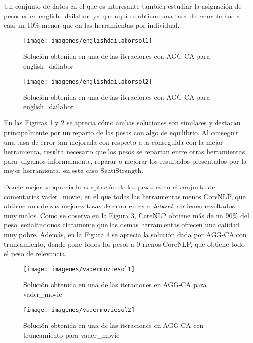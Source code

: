 Un conjunto de datos en el que es interesante también estudiar la asignación de pesos es en english\_dailabor, ya que aquí se obtiene una tasa de error de hasta casi un 10\% menor que en las herramientas por individual. 

\newpage
\begin{figure} [H]
	\centering
	\texttt{[image: imagenes/englishdailaborsol1]}
	\caption{Solución obtenida en una de las iteraciones con AGG-CA para english\_dailabor}
	\label{fig:englishdailaborsol1}
\end{figure}

\begin{figure} [H]
	\centering
	\texttt{[image: imagenes/englishdailaborsol2]}
	\caption{Solución obtenida en una de las iteraciones con AGG-CA para english\_dailabor}
	\label{fig:englishdailaborsol2}
\end{figure}

En las Figuras \ref{fig:englishdailaborsol1} y \ref{fig:englishdailaborsol2} se aprecia cómo ambas soluciones son similares y destacan principalmente por un reparto de los pesos con algo de equilibrio. Al conseguir una tasa de error tan mejorada con respecto a la conseguida con la mejor herramienta, resulta necesario que los pesos se repartan entre otras herramientas para, digamos informalmente, reparar o mejorar los resultados presentados por la mejor herramienta, en este caso SentiStrength.

Donde mejor se aprecia la adaptación de los pesos es en el conjunto de comentarios vader\_movie, en el que todas las herramientas menos CoreNLP, que obtiene una de sus mejores tasas de error en este \textit{dataset}, obtienen resultados muy malos. Como se observa en la Figura \ref{fig:vadermoviesol1}, CoreNLP obtiene más de un 90\% del peso, señalándonos claramente que las demás herramientas ofrecen una calidad muy pobre. Además, en la Figura \ref{fig:vadermoviesol2} se aprecia la solución dada por AGG-CA con truncamiento, donde pone todos los pesos a 0 menos CoreNLP, que obtiene todo el peso de relevancia.
\begin{figure} [H]
	\centering
	\texttt{[image: imagenes/vadermoviesol1]}
	\caption{Solución obtenida en una de las iteraciones en AGG-CA para vader\_movie}
	\label{fig:vadermoviesol1}
\end{figure}

\newpage
\begin{figure} [H]
	\centering
	\texttt{[image: imagenes/vadermoviesol2]}
	\caption{Solución obtenida en una de las iteraciones en AGG-CA con truncamiento para vader\_movie}
	\label{fig:vadermoviesol2}
\end{figure}
